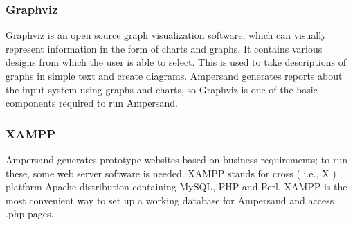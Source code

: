 \documentclass[12pt]{report}
\begin{document}
\subsubsection*{Graphviz}
Graphviz is an open source graph visualization software, which can
visually represent information in the form of charts and graphs. It contains
various designs from which the user is able to select. This is used to take
descriptions of graphs in simple text and create diagrams. Ampersand generates
reports about the input system using graphs and charts, so Graphviz is one of the
basic components required to run Ampersand.

\subsubsection*{XAMPP}
Ampersand generates prototype websites based on business requirements; to run
these, some web server software is needed. XAMPP stands for cross \big( i.e., X
\big) platform Apache distribution containing MySQL, PHP and Perl. XAMPP \cite{xampp} is the
most convenient way to set up a working database for Ampersand and access .php
pages. 

%
\end{document}
